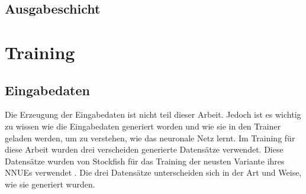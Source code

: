 \subsection{Ausgabeschicht}


\section{Training}

\subsection{Eingabedaten}

Die Erzeugung der Eingabedaten ist nicht teil dieser Arbeit. Jedoch ist es wichtig zu wissen wie die Eingabedaten generiert worden und wie sie in den Trainer geladen werden, um zu verstehen, wie das neuronale Netz lernt. Im Training für diese Arbeit wurden drei verscheiden generierte Datensätze verwendet. Diese Datensätze wurden von Stockfish für das Training der neusten Variante ihres \acp{NNUE} verwendet \cite{StockfishNewestNetJul04}. Die drei Datensätze unterscheiden sich in der Art und Weise, wie sie generiert wurden.






